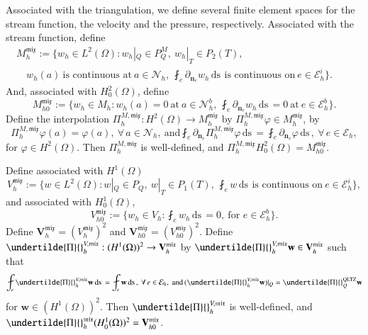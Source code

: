 \documentclass[12pt,showkeys]{amsart}
\begin{document}
Associated with the triangulation, we define several finite element spaces for the stream function, the velocity and the pressure, respectively. Associated with the stream function, define
\begin{multline*}
 M_h^{\mathfrak{mix}}:=\{w_h\in L^2(\Omega):w_h|_Q\in P_Q^M,\ w_h|_T\in P_2(T),\\ 
\quad w_h(a)\ \mbox{is\ continuous\ at}\ a\in\mathcal{N}_h,\ \fint_e\partial_{\mathbf{n}_e}w_h{\,\mathrm{ds}\,}\ \mbox{is\ continuous\ on}\ e\in\mathcal{E}_h^i\}.\qquad
\end{multline*}
And, associated with $H^2_0(\Omega)$, define 
$$
M_{h0}^{\mathfrak{mix}}:=\{w_h\in M_h:w_h(a)=0\ \mbox{at}\ a\in\mathcal{N}_h^b,\ \fint_e\partial_{\mathbf{n}_e}w_h{\,\mathrm{ds}\,}=0\ \mbox{at}\ e\in\mathcal{E}_h^b\}.
$$
Define the interpolation $\Pi_h^{M,{\mathfrak{mix}}}:H^2(\Omega)\to M_h^{\mathfrak{mix}}$ by $\Pi_h^{M,{\mathfrak{mix}}}\varphi\in M_h^{\mathfrak{mix}}$, by
$$
\Pi_h^{M,{\mathfrak{mix}}}\varphi(a)=\varphi(a),\ \forall\,a\in \mathcal{N}_h, \ \mbox{and} \fint_e\partial_{\mathbf{n}_e}\Pi_h^{M,{\mathfrak{mix}}}\varphi{\,\mathrm{ds}\,}=\fint_e\partial_{\mathbf{n}_e}\varphi{\,\mathrm{ds}\,}, \ \forall\,e\in\mathcal{E}_h,
$$
for $\varphi\in H^2(\Omega)$. Then $\Pi_h^{M,{\mathfrak{mix}}}$ is well-defined, and $\Pi_h^{M,{\mathfrak{mix}}} H^2_0(\Omega)= M_{h0}^{\mathfrak{mix}}$.

Define associated with $H^1(\Omega)$
$$
V_h^{\mathfrak{mix}}:=\{w\in L^2(\Omega):w|_Q\in P_Q,\ w|_T\in P_1(T),\ \fint_e w{\,\mathrm{ds}\,}\ \mbox{is\ continuous\ on}\ e\in\mathcal{E}_h^i\},
$$
and associated with $H^1_0(\Omega)$,
$$
V_{h0}^{\mathfrak{mix}}:=\{w_h\in V_h:\fint_ew_h{\,\mathrm{ds}\,}=0,\ \mbox{for\ }e\in \mathcal{E}_h^b\}.
$$
Define $\mathbf{V}_h^{\mathfrak{mix}}=(V_h^{\mathfrak{mix}})^2$ and $\mathbf{V}_{h0}^{\mathfrak{mix}}=(V_{h0}^{\mathfrak{mix}})^2$. Define $\undertilde{\Pi}{}_h^{V,{\mathfrak{mix}}}:(H^1(\Omega))^2\to \mathbf{V}_h^{\mathfrak{mix}}$ by $\undertilde{\Pi}{}_h^{V,{\mathfrak{mix}}}\mathbf{w}\in \mathbf{V}_h^{\mathfrak{mix}}$ such that
$$
\fint_e\undertilde{\Pi}{}_h^{V,{\mathfrak{mix}}}\mathbf{w}{\,\mathrm{ds}\,}=\fint_e\mathbf{w}{\,\mathrm{ds}\,},\ \forall\,e\in\mathcal{E}_h,\ \mbox{and}\,(\undertilde{\Pi}{}_h^{V,{\mathfrak{mix}}}\mathbf{w})|_Q=\undertilde{\Pi}{}_Q^{\rm QLTZ}\mathbf{w}
$$
for $\mathbf{w}\in (H^1(\Omega))^2$. Then $\undertilde{\Pi}{}_h^{V,{\mathfrak{mix}}}$ is well-defined, and $\undertilde{\Pi}{}_h^{\mathfrak{mix}}(H^1_0(\Omega))^2=\mathbf{V}_{h0}^{\mathfrak{mix}}$.
\end{document}

